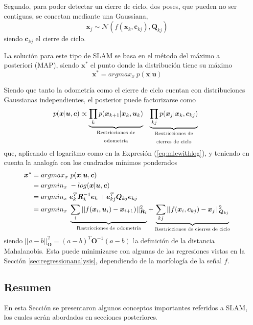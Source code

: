 Segundo, para poder detectar un cierre de ciclo, dos poses, que pueden no ser contiguas, se conectan mediante una Gaussiana,
\begin{equation}
    \bm{x}_j \sim \mathcal{N}(f(\bm{x}_k,\bm{c}_{kj}), \bm{Q}_{kj})
\end{equation}
siendo $\bm{c}_{kj}$ el cierre de ciclo.

La solución para este tipo de SLAM se basa en el método del máximo a posteriori (MAP), siendo $\bm{x}^*$ el punto donde la distribución tiene su máximo
\begin{equation}
    \bm{x}^* = argmax_x\ p(\bm{x}|\bm{u})
\end{equation}

Siendo que tanto la odometría como el cierre de ciclo cuentan con distribuciones Gaussianas independientes, el posterior puede factorizarse como
\begin{equation}
    p(\bm{x}|\bm{u},\bm{c}) \propto \underbrace{\prod_k p(\bm{x}_{k+1}|\bm{x}_{k},\bm{u}_k)}_{\text{\parbox{10em}{\centering Restricciones de odometría}}}\ \underbrace{\prod_{kj}p(\bm{x}_j|\bm{x}_k,\bm{c}_{kj})}_{\text{\parbox{10em}{\centering Restricciones de cierres de ciclo}}}
\end{equation}
que, aplicando el logaritmo como en la Expresión (\ref{eq:mlewithlog}), y teniendo en cuenta la analogía con los cuadrados mínimos ponderados
\begin{align}
    \bm{x}^* &= argmax_x\ p(\bm{x}|\bm{u},\bm{c}) \\
    &= argmin_x\ -log(\bm{x}|\bm{u},\bm{c}) \\
     &= argmin_x\ \bm{e}_k^T\bm{R}_k^{-1}\bm{e}_k + \bm{e}_{kj}^T\bm{Q}_{kj}\bm{e}_{kj} \\
     &= argmin_x\ \underbrace{\sum_{i} ||f(\bm{x}_i,\bm{u}_i)-\bm{x}_{i+1})||^2_{\bm{R}_i}}_{\text{{\centering Restricciones de odometría}}} + \underbrace{\sum_{kj} ||f(\bm{x}_i,\bm{c}_{kj}) - \bm{x}_{j}||^2_{\bm{Q}_{kj}}}_{\text{{\centering Restricciones de cierres de ciclo}}}
\end{align}
siendo $||a-b||^2_{\bm{O}} = (a - b)^T\bm{O}^{-1}(a-b)$ la definición de la distancia Mahalanobis. Esta puede minimizarse con algunas de las regresiones vistas en la Sección \ref{sec:regressionanalysis}, dependiendo de la morfología de la señal $f$.

\fi


\subsection{Resumen}
En esta Sección se presentaron algunos conceptos importantes referidos a SLAM, los cuales serán abordados en secciones posteriores.